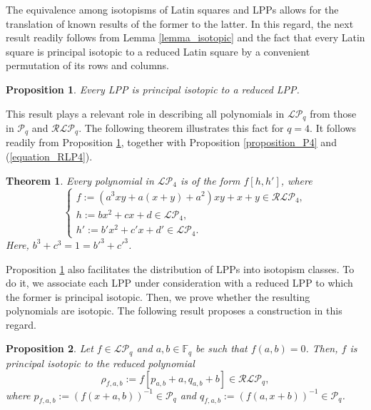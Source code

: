 \documentclass[pdflatex,sn-mathphys-num]{sn-jnl}
\theoremstyle{thmstyleone}%
\newtheorem{theorem}{Theorem}[section]
\newtheorem{proposition}{Proposition}[section]
\begin{document}
The equivalence among isotopisms of Latin squares and LPPs allows for the translation of known results of the former to the latter. In this regard, the next result readily follows from Lemma \ref{lemma_isotopic} and the fact that every Latin square is principal isotopic to a reduced Latin square by a convenient permutation of its rows and columns. 

\begin{proposition}\label{proposition_isotopic_reduced} Every LPP is principal isotopic to a reduced LPP. 
\end{proposition}

\vspace{0.2cm}

This result plays a relevant role in describing all polynomials in $\mathcal{LP}_q$ from those in $\mathcal{P}_q$ and $\mathcal{RLP}_q$. The following theorem illustrates this fact for $q=4$. It follows readily from Proposition \ref{proposition_isotopic_reduced}, together with Proposition \ref{proposition_P4} and (\ref{equation_RLP4}).

\begin{theorem}\label{theorem_LP} Every polynomial in $\mathcal{LP}_4$ is of the form $f[h,h']$, where
\[\begin{cases}
f:=\left(a^3xy+a(x+y)+a^2\right)xy+x+y\in\mathcal{RLP}_4,\\
h:=bx^2+cx+d\in\mathcal{LP}_4,\\
h':=b'x^2+c'x+d'\in\mathcal{LP}_4.
\end{cases}\]
Here, $b^3+c^3=1={b'}^3+{c'}^3$.
\end{theorem}

\vspace{0.2cm}

Proposition \ref{proposition_isotopic_reduced} also facilitates the distribution of LPPs into isotopism classes. To do it, we associate each LPP under consideration with a reduced LPP to which the former is principal isotopic. Then, we prove whether the resulting polynomials are isotopic. The following result proposes a construction in this regard.

\begin{proposition}\label{proposition_isotopic_reduced_2} Let $f\in \mathcal{LP}_q$  and $a,b\in \mathbb{F}_q$ be such that $f(a,b)=0$. Then, $f$ is principal isotopic to the reduced polynomial 
\[\rho_{f,a,b}:=f\left[p_{a,b}+a,q_{a,b}+b\right]\in \mathcal{RLP}_q,\]
where  $p_{f,a,b}:=\left(f(x+a,b)\right)^{-1}\in\mathcal{P}_q$ and $q_{f,a,b}:=\left(f(a,x+b)\right)^{-1}\in\mathcal{P}_q$.
\end{proposition}
\end{document}

